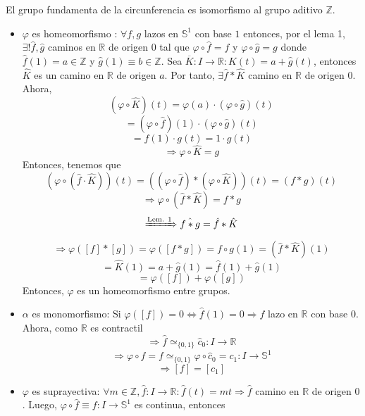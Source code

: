 \begin{theo}
  El grupo fundamenta de la circunferencia es isomorfismo al grupo aditivo $\mathbb{Z}$.
\end{theo}

\begin{dem}
  \begin{itemize}
    \item $\varphi$ es homeomorfismo : $\forall f,g$ lazos en $\mathbb{S}^{1}$ con base $1$ entonces, por el lema 1, $\exists ! \hat{ f }, \hat{ g }$ caminos en $\mathbb{R}$ de origen $0$ tal que $\varphi \circ \hat{ f } = f$ y $\varphi \circ \hat{ g } = g$ donde $\hat{ f }(1) = a \in \mathbb{Z}$ y $\hat{ g }(1) \equiv b \in \mathbb{Z}$. Sea $\overline{K} : I \to \mathbb{R} : \hat{ K }(t) = a + \hat{ g }(t) $, entonces $\hat{ K }$ es un camino en $\mathbb{R}$ de origen $a$. Por tanto, $\exists \hat{ f } * \hat{ K }$ camino en $\mathbb{R}$ de origen $ 0$. Ahora,
      \[ 
        (\varphi \circ \hat{ K })(t) = \varphi(a) \cdot (\varphi \circ \hat{ g })(t)
      \] 
      \[ 
        = (\varphi \circ \hat{ f })(1) \cdot (\varphi \circ \hat{ g })(t) 
      \] 
      \[ 
        = f(1) \cdot g(t) = 1 \cdot g(t)
      \] 
      \[ 
        \Rightarrow \varphi \circ \hat{ K } = g
      \] 
      Entonces, tenemos que
      \[ 
        (\varphi \circ (\hat{ f } \cdot \hat{ K }))(t) = ((\varphi \circ \hat{ f }) * (\varphi \circ \hat{ K }))(t) = (f * g)(t)
      \] 
      \[ 
        \Rightarrow \varphi \circ (\hat{ f } * \hat{ K }) = f * g
      \] 
      \[ 
        \xRightarrow[]{ \text{Lem. 1} } \hat{ f * g } = \hat{ f } * \hat{ K }
      \] 
      \[ 
        \Rightarrow \varphi([ f ] * [ g ])  = \varphi([ f * g ]) = \hat{ f \circ g }(1) = (\hat{ f } * \hat{ K })(1)
      \] 
      \[ 
        = \hat{ K }(1) = a + \hat{ g }(1) = \hat{ f }(1) + \hat{ g }(1)
      \] 
      \[ 
        = \varphi([ f ]) + \varphi([ g ])
      \] 
      Entonces, $ \varphi$ es un homeomorfismo entre grupos.
    \item $\alpha$ es monomorfismo: Si $\varphi([ f ]) = 0 \Leftrightarrow \hat{ f }(1) = 0 \Rightarrow \hat{ f }$ lazo en $\mathbb{R}$ con base $0$. Ahora, como $\mathbb{R}$ es contractil
      \[ 
        \Rightarrow \hat{ f } \simeq_{\{ 0, 1 \}} \hat{ c }_{0} : I \to \mathbb{R}
      \] 
      \[ 
        \Rightarrow \varphi \circ \hat{ f } = f \simeq_{\{ 0, 1 \}}  \varphi \circ \hat{ c }_{0} = c_{1} : I \to \mathbb{S}^{1}
      \] 
      \[ 
        \Rightarrow [ f ] = [ c_{1} ] 
      \] 
    \item $\varphi$ es suprayectiva: $\forall m \in \mathbb{Z}, \hat{ f } : I \to \mathbb{R} : \hat{ f }(t) = m t \Rightarrow \hat{ f }$ camino en $\mathbb{R}$ de origen $0$. Luego, $\varphi \circ \hat{ f } \equiv f :  I \to \mathbb{S}^{1}$ es continua, entonces

\end{itemize}
\end{dem}
